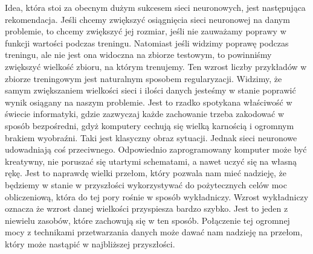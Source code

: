 Idea, która stoi za obecnym dużym sukcesem sieci neuronowych, jest następująca rekomendacja. Jeśli chcemy zwiększyć osiągnięcia sieci neuronowej na danym problemie, to chcemy zwiększyć jej rozmiar, jeśli nie zauważamy poprawy w funkcji wartości podczas treningu. Natomiast jeśli widzimy poprawę podczas treningu, ale nie jest ona widoczna na zbiorze testowym, to powinniśmy zwiększyć wielkość zbioru, na którym trenujemy. Ten wzrost liczby przykładów w zbiorze treningowym jest naturalnym sposobem regularyzacji. Widzimy, że samym zwiększaniem wielkości sieci i ilości danych jesteśmy w stanie poprawić wynik osiągany na naszym problemie. Jest to rzadko spotykana właściwość w świecie informatyki, gdzie zazwyczaj każde zachowanie trzeba zakodować w sposób bezpośredni, gdyż komputery cechują się wielką karnością i ogromnym brakiem wyobraźni. Taki jest klasyczny obraz sytuacji. Jednak sieci neuronowe udowadniają coś przeciwnego. Odpowiednio zaprogramowany komputer może być kreatywny, nie poruszać się utartymi schematami, a nawet uczyć się na własną rękę. Jest to naprawdę wielki przełom, który pozwala nam mieć nadzieję, że będziemy w stanie w przyszłości wykorzystywać do pożytecznych celów moc obliczeniową, która do tej pory rośnie w sposób wykładniczy. Wzrost wykładniczy oznacza że wzrost danej wielkości przyspiesza bardzo szybko. Jest to jeden z niewielu zasobów, które zachowują się w ten sposób. Połączenie tej ogromnej mocy z technikami przetwarzania danych może dawać nam nadzieję na przełom, który może nastąpić w najbliższej przyszłości.

